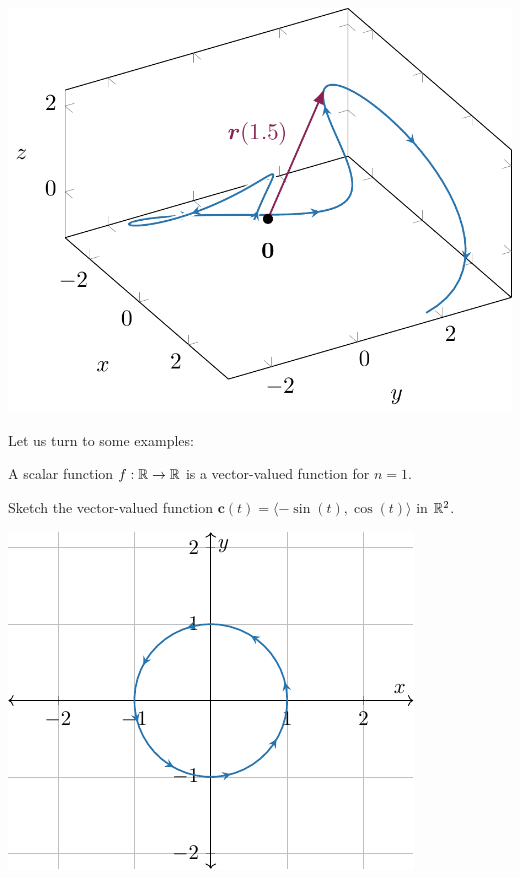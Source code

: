  \begin{center}        
        \includegraphics[scale=.75]{chapters/2-RealAnalysis/figures/figures-vectorvalpoint.pdf}
    \end{center}

Let us turn to some examples:

\begin{example}
A scalar function $f : \mathbb{R} \to \mathbb{R}$ is a vector-valued function for $n=1$.
\end{example}


\begin{example}
Sketch the vector-valued function $\bm{c}(t) = \langle  -\sin(t), \cos(t) \rangle$ in $\mathbb{R}^2$.

 \begin{center}        
        \includegraphics{chapters/2-RealAnalysis/figures/figures-vectorcircle.pdf}
    \end{center}

\end{example}


